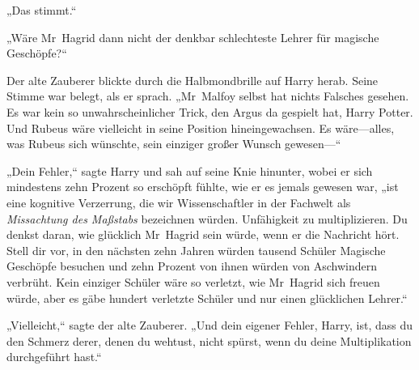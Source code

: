 „Das stimmt.“

„Wäre Mr~Hagrid dann nicht der denkbar schlechteste Lehrer für magische Geschöpfe?“

Der alte Zauberer blickte durch die Halbmondbrille auf Harry herab. Seine Stimme war belegt, als er sprach.
„Mr~Malfoy selbst hat nichts Falsches gesehen. Es war kein so unwahrscheinlicher Trick, den Argus da gespielt hat, Harry Potter. Und Rubeus wäre vielleicht in seine Position hineingewachsen. Es wäre—alles, was Rubeus sich wünschte, sein einziger großer Wunsch gewesen—“

„Dein Fehler,“ sagte Harry und sah auf seine Knie hinunter, wobei er sich mindestens zehn Prozent so erschöpft fühlte, wie er es jemals gewesen war, „ist eine kognitive Verzerrung, die wir Wissenschaftler in der Fachwelt als \emph{Missachtung des Maßstabs} bezeichnen würden. Unfähigkeit zu multiplizieren. Du denkst daran, wie glücklich Mr~Hagrid sein würde, wenn er die Nachricht hört. Stell dir vor, in den nächsten zehn Jahren würden tausend Schüler Magische Geschöpfe besuchen und zehn Prozent von ihnen würden von Aschwindern verbrüht. Kein einziger Schüler wäre so verletzt, wie Mr~Hagrid sich freuen würde, aber es gäbe hundert verletzte Schüler und nur einen glücklichen Lehrer.“

„Vielleicht,“ sagte der alte Zauberer. „Und dein eigener Fehler, Harry, ist, dass du den Schmerz derer, denen du wehtust, nicht spürst, wenn du deine Multiplikation durchgeführt hast.“

